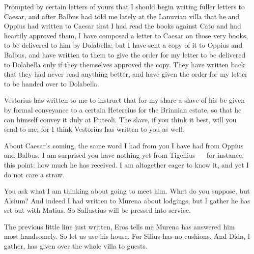 

 Prompted by certain letters of yours that I should begin writing fuller letters to Caesar, and after Balbus had told me lately at the Lanuvian villa that he and Oppius had written to Caesar that I had read the books against Cato and had heartily approved them, I have composed a letter to Caesar on those very books, to be delivered to him by Dolabella; but I have sent a copy of it to Oppius and Balbus, and have written to them to give the order for my letter to be delivered to Dolabella only if they themselves approved the copy. They have written back that they had never read anything better, and have given the order for my letter to be handed over to Dolabella.

 Vestorius has written to me to instruct that for my share a slave of his be given by formal conveyance to a certain Hetereius for the Brinnian estate, so that he can himself convey it duly at Puteoli. The slave, if you think it best, will you send to me; for I think Vestorius has written to you as well.

 About Caesar's coming, the same word I had from you I have had from Oppius and Balbus. I am surprised you have nothing yet from Tigellius --- for instance, this point: how much he has received. I am altogether eager to know it, and yet I do not care a straw.

 You ask what I am thinking about going to meet him. What do you suppose, but Alsium? And indeed I had written to Murena about lodgings, but I gather he has set out with Matius. So Sallustius will be pressed into service.

 The previous little line just written, Eros tells me Murena has answered him most handsomely. So let us use his house. For Silius has no cushions. And Dida, I gather, has given over the whole villa to guests.
